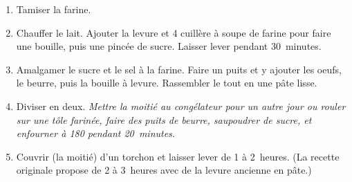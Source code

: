 

\begin{ingredients}
\end{ingredients}


\begin{recipe}
  \begin{enumerate}

  \item Tamiser la farine.

  \item Chauffer le lait.  Ajouter la levure et 4 cuillère à soupe de
    farine pour faire une bouille, puis une pincée de sucre.  Laisser
    lever pendant 30~minutes.

  \item Amalgamer le sucre et le sel à la farine.  Faire un puits et y
    ajouter les oeufs, le beurre, puis la bouille à levure.
    Rassembler le tout en une pâte lisse.

  \item Diviser en deux.  {\it Mettre la moitié au congélateur pour un
      autre jour ou rouler sur une tôle farinée, faire des puits de
      beurre, saupoudrer de sucre, et enfourner à 180\C{} pendant
      20~minutes.}

  \item Couvrir (la moitié) d'un torchon et laisser lever de 1 à
    2~heures.  (La recette originale propose de 2 à 3~heures avec de
    la levure ancienne en pâte.)

  \end{enumerate}
\end{recipe}


\begin{ingredients}
\end{ingredients}


